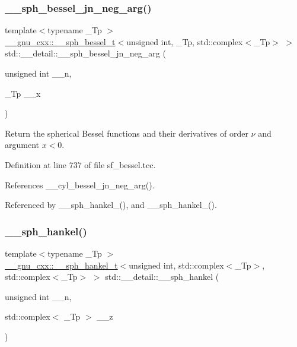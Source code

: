 \subsubsection{\texorpdfstring{\+\_\+\+\_\+sph\+\_\+bessel\+\_\+jn\+\_\+neg\+\_\+arg()}{\_\_sph\_bessel\_jn\_neg\_arg()}}
{\footnotesize\ttfamily template$<$typename \+\_\+\+Tp $>$ \\
\hyperlink{struct____gnu__cxx_1_1____sph__bessel__t}{\+\_\+\+\_\+gnu\+\_\+cxx\+::\+\_\+\+\_\+sph\+\_\+bessel\+\_\+t}$<$unsigned int, \+\_\+\+Tp, std\+::complex$<$\+\_\+\+Tp$>$ $>$ std\+::\+\_\+\+\_\+detail\+::\+\_\+\+\_\+sph\+\_\+bessel\+\_\+jn\+\_\+neg\+\_\+arg (\begin{DoxyParamCaption}\item[{unsigned int}]{\+\_\+\+\_\+n,  }\item[{\+\_\+\+Tp}]{\+\_\+\+\_\+x }\end{DoxyParamCaption})}

Return the spherical Bessel functions and their derivatives of order $ \nu $ and argument $ x < 0 $. 

Definition at line 737 of file sf\+\_\+bessel.\+tcc.



References \+\_\+\+\_\+cyl\+\_\+bessel\+\_\+jn\+\_\+neg\+\_\+arg().



Referenced by \+\_\+\+\_\+sph\+\_\+hankel\+\_(), and \+\_\+\+\_\+sph\+\_\+hankel\+\_().

\mbox{\label{namespacestd_1_1____detail_a1babbc6df4e260ad0e828044c9f33ca1}} 
\subsubsection{\texorpdfstring{\+\_\+\+\_\+sph\+\_\+hankel()}{\_\_sph\_hankel()}}
{\footnotesize\ttfamily template$<$typename \+\_\+\+Tp $>$ \\
\hyperlink{struct____gnu__cxx_1_1____sph__hankel__t}{\+\_\+\+\_\+gnu\+\_\+cxx\+::\+\_\+\+\_\+sph\+\_\+hankel\+\_\+t}$<$unsigned int, std\+::complex$<$\+\_\+\+Tp$>$, std\+::complex$<$\+\_\+\+Tp$>$ $>$ std\+::\+\_\+\+\_\+detail\+::\+\_\+\+\_\+sph\+\_\+hankel (\begin{DoxyParamCaption}\item[{unsigned int}]{\+\_\+\+\_\+n,  }\item[{std\+::complex$<$ \+\_\+\+Tp $>$}]{\+\_\+\+\_\+z }\end{DoxyParamCaption})}



